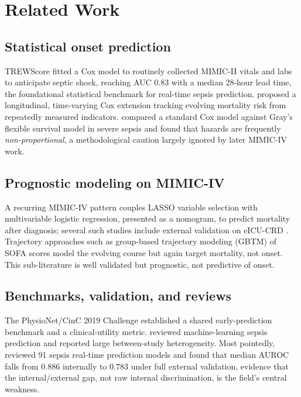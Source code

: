 \documentclass[conference]{IEEEtran}
\begin{document}
\section{Related Work}
\label{sec:related}

\subsection{Statistical onset prediction}
TREWScore \cite{henry2015trewscore} fitted a Cox model to routinely collected
MIMIC-II vitals and labs to anticipate septic shock, reaching AUC $0.83$ with a
median 28-hour lead time, the foundational statistical benchmark for real-time
sepsis prediction. \textcite{liaw2019mortality} proposed a
longitudinal, time-varying Cox extension tracking evolving mortality risk from
repeatedly measured indicators. \textcite{kasal2004cox}
compared a standard Cox model against Gray's flexible survival model in severe
sepsis and found that hazards are frequently \emph{non-proportional}, a
methodological caution largely ignored by later MIMIC-IV work.

\subsection{Prognostic modeling on MIMIC-IV}
A recurring MIMIC-IV pattern couples LASSO variable selection with
multivariable logistic regression, presented as a nomogram, to predict
mortality after diagnosis; several such studies include external validation on
eICU-CRD \cite{yuan2023nomogram}. Trajectory approaches such as group-based
trajectory modeling (GBTM) of SOFA scores \cite{yang2022gbtm} model the
evolving course but again target mortality, not onset. This sub-literature is
well validated but prognostic, not predictive of onset.

\subsection{Benchmarks, validation, and reviews}
The PhysioNet/CinC 2019 Challenge \cite{reyna2020physionet} established a shared
early-prediction benchmark and a clinical-utility metric.
\textcite{fleuren2020ml} reviewed machine-learning sepsis prediction and reported
large between-study heterogeneity. Most pointedly,
\textcite{wang2025srpm} reviewed 91 sepsis real-time prediction models and found
that median AUROC falls from $0.886$ internally to $0.783$ under full external
validation, evidence that the internal/external gap, not raw internal
discrimination, is the field's central weakness.
\end{document}
